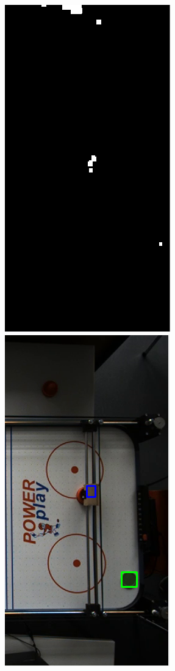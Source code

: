 \begin{figure} [h]
\begin{minipage}[t]{0.25\textwidth}
\includegraphics[scale =0.45]{images/bin_robo}
\end{minipage}
\hspace{0.05\textwidth}
\begin{minipage}[t]{0.25\textwidth}
\vspace{0pt}
\includegraphics[scale =0.45]{images/detect}
\end{minipage}


\end{figure}
